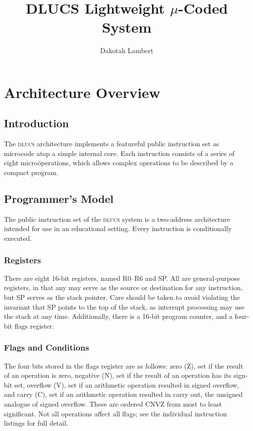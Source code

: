 \documentclass[11pt]{book}
\title{{DLUCS} Lightweight \(\mu\)-Coded System}
\author{Dakotah Lambert}
\date{}
\begin{document}
\maketitle
\frontmatter
\tableofcontents

\mainmatter
\chapter{Architecture Overview}
\section{Introduction}
The \textsc{dlucs} architecture implements
a featureful public instruction set
as microcode atop a simple internal core.
Each instruction consists of a series of eight micro\"operations,
which allows complex operations to be described by a compact program.

\section{Programmer's Model}
The public instruction set of the \textsc{dlucs} system
is a two-address architecture
intended for use in an educational setting.
Every instruction is conditionally executed.

\subsection{Registers}
There are eight 16-bit registers,
named R0--R6 and SP.
All are general-purpose registers,
in that any may serve as the source or destination
for any instruction,
but SP serves as the stack pointer.
Care should be taken to avoid violating the invariant
that SP points to the top of the stack,
as interrupt processing may use the stack at any time.
Additionally, there is a 16-bit program counter,
and a four-bit flags register.

\subsection{Flags and Conditions}
The four bits stored in the flags register are as follows:
zero (Z), set if the result of an operation is zero,
negative (N), set if the result of an operation has its sign-bit set,
overflow (V), set if an arithmetic operation resulted in signed overflow,
and carry (C), set if an arithmetic operation resulted in carry out,
the unsigned analogue of signed overflow.
These are ordered CNVZ from most to least significant.
Not all operations affect all flags;
see the individual instruction listings for full detail.
\end{document}
